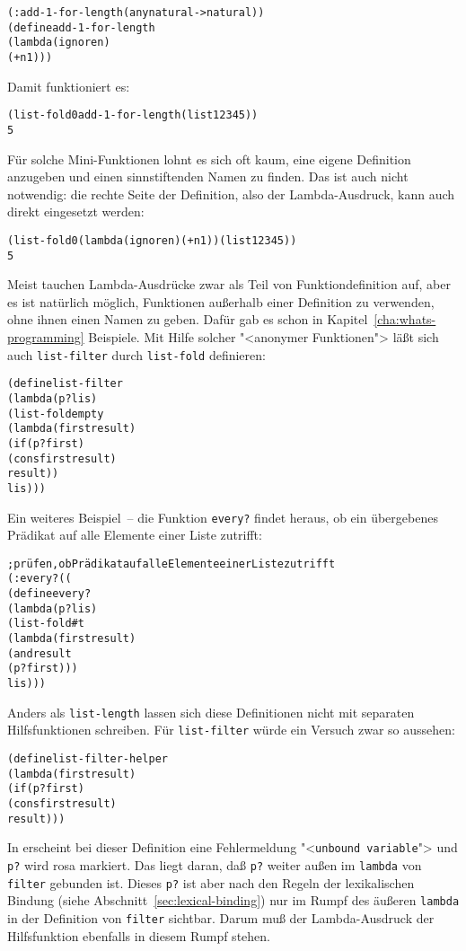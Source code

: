 \begin{alltt}
(: add-1-for-length (any natural -> natural))
(define add-1-for-length
  (lambda (ignore n)
    (+ n 1)))
\end{alltt}
%
Damit funktioniert es:
%
\begin{alltt}
(list-fold 0 add-1-for-length (list 1 2 3 4 5))
\evalsto{} 5
\end{alltt}
%
Für solche Mini-Funktionen lohnt es sich oft kaum, eine eigene
Definition anzugeben und einen sinnstiftenden Namen zu finden.  Das
ist auch nicht notwendig: die rechte Seite der Definition, also der
Lambda-Ausdruck, kann auch direkt eingesetzt werden:
%
\begin{alltt}
(list-fold 0 (lambda (ignore n) (+ n 1)) (list 1 2 3 4 5))
\evalsto{} 5
\end{alltt}
%
Meist tauchen Lambda-Ausdrücke zwar als Teil von Funktiondefinition
auf, aber es ist natürlich möglich, Funktionen außerhalb einer
Definition zu verwenden, ohne ihnen einen Namen zu geben.  Dafür gab
es schon in Kapitel~\ref{cha:whats-programming} Beispiele. Mit Hilfe
solcher "<anonymer Funktionen"> läßt sich auch \texttt{list-filter}
durch \texttt{list-fold} definieren:
%
\begin{alltt}
(define list-filter
  (lambda (p? lis)
    (list-fold empty
               (lambda (first result)
                 (if (p? first)
                     (cons first result)
                     result))
               lis)))
\end{alltt}
%
Ein weiteres Beispiel~-- die Funktion
\texttt{every?} findet heraus, ob ein
übergebenes Prädikat auf alle Elemente einer Liste zutrifft:
\label{page:every}
%
\begin{alltt}
; prüfen, ob Prädikat auf alle Elemente einer Liste zutrifft
(: every? ((%a -> boolean) (list-of %a) -> boolean))
(define every?
  (lambda (p? lis)
    (list-fold #t
               (lambda (first result)
                 (and result
                      (p? first)))
               lis)))
\end{alltt}
%
Anders als \texttt{list-length} lassen sich diese Definitionen
nicht mit separaten Hilfsfunktionen schreiben.  Für
\texttt{list-filter} würde ein Versuch zwar so aussehen:
%
\begin{alltt}
(define list-filter-helper
  (lambda (first result)
    (if (p? first)
        (cons first result)
        result)))
\end{alltt}
%
In \drscheme{} erscheint bei dieser Definition eine Fehlermeldung 
"<\texttt{unbound variable}"> und \texttt{p?} wird rosa markiert.  Das
liegt daran, daß \texttt{p?} weiter außen im \texttt{lambda} von
\texttt{filter} gebunden ist.  Dieses \texttt{p?} ist aber nach den
Regeln der lexikalischen Bindung (siehe
Abschnitt~\ref{sec:lexical-binding}) nur im Rumpf des äußeren
\texttt{lambda} in der Definition von \texttt{filter} sichtbar.  Darum
muß der Lambda-Ausdruck der Hilfsfunktion ebenfalls in diesem
Rumpf stehen.

